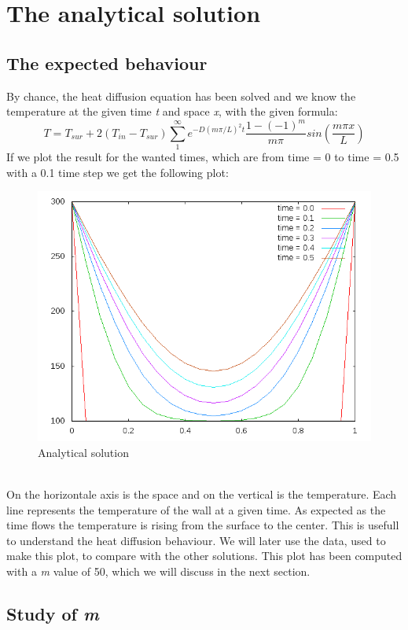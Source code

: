 \documentclass[12pt, a4paper]{report}
\begin{document}
\chapter{The analytical solution}
\section{The expected behaviour}
By chance, the heat diffusion equation has been solved and we know the temperature at the given time \textit{t} and space \textit{x}, with the given formula: \begin{equation}
T = T_{sur} + 2(T_{in} - T_{sur})\sum_{1}^{\infty}e^{-D(m\pi/L)^{2}t}\frac{1-(-1)^{m}}{m\pi}sin(\frac{m\pi x}{L})
\end{equation}
If we  plot the result for the wanted times, which are from time = 0 to time = 0.5 with a 0.1 time step we get the following plot:
\begin{figure}[h]
\centering
\includegraphics[scale=0.6]{Analytic.png}
\caption{Analytical solution}
\end{figure}
\\
On the horizontale axis is the space and on the vertical is the temperature. Each line represents the temperature of the wall at a given time.
As expected as the time flows the temperature is rising from the surface to the center. This is usefull to understand the heat diffusion behaviour. We will later use the data, used to make this plot, to compare with the other solutions. This plot has been computed with a \textit{m} value of 50, which we will discuss in the next section.


\section{Study of \textit{m}}
\end{document}
